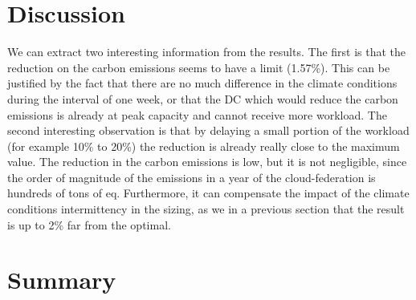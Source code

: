 \section{Discussion}





We can extract two interesting information from the results. The first is that the reduction on the carbon emissions seems to have a limit (1.57\%). This can be justified by the fact that there are no much difference in the climate conditions during the interval of one week, or that the DC which would reduce the carbon emissions is already at peak capacity and cannot receive more workload. The second interesting observation is that by delaying a small portion of the workload (for example 10\% to 20\%)  the reduction is already really close to the maximum value. The reduction in the carbon emissions is low, but it is not negligible, since the order of magnitude of the emissions in a year of the cloud-federation is hundreds of tons of  eq. Furthermore, it can compensate the impact of the climate conditions intermittency in the sizing, as we in a previous section that the result is up to 2\% far from the optimal.




\section{Summary}

